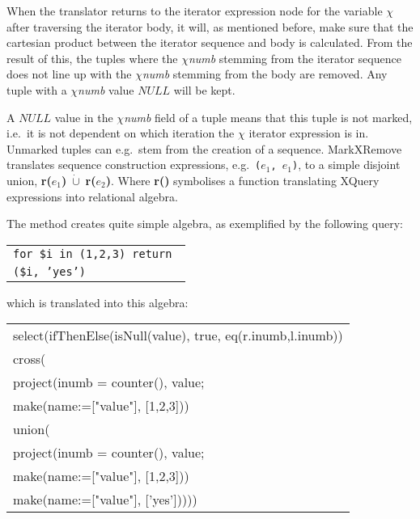 When the translator returns to the iterator expression node for the variable $\chi$ after traversing the iterator
body, it will, as mentioned before, make sure that the cartesian product between the iterator sequence and body is
calculated. From the result of this, the tuples where the $\chi$\textit{numb} stemming from the iterator
sequence does not line up with the $\chi$\textit{numb} stemming from the body are removed. Any tuple with a
$\chi$\textit{numb} value $NULL$ will be kept.

A $NULL$ value in the $\chi$\textit{numb} field of a tuple means that this tuple is not marked, i.e.\ it is
not dependent on which iteration the $\chi$ iterator expression is in. Unmarked
tuples can e.g.\ stem from the creation of a sequence. MarkXRemove translates sequence construction expressions,
e.g.\ \texttt{(}$e_{1}$\texttt{, }$e_{1}$\texttt{)}, to a simple disjoint union,
\textbf{r(}$e_{1}$\textbf{)}$\;\dot\cup\;$\textbf{r(}$e_{2}$\textbf{)}. Where \textbf{r()} symbolises a function
translating XQuery expressions into relational algebra.

The method creates quite simple algebra, as exemplified by the following query:

\begin{center}
\begin{tabular}{l}
\texttt{for \$i in (1,2,3) return } \\ \qquad
\texttt{(\$i, 'yes')}
\end{tabular}
\end{center}

which is translated into this algebra:
\begin{center}
\begin{tabular}{l}
\textsf{select(ifThenElse(isNull(value), true, eq(r.inumb,l.inumb))} \\ \quad
\textsf{cross(} \\\quad\quad
\textsf{project(inumb = counter(), value;}\\\quad\quad\quad
\textsf{make(name:=["value"], [1,2,3]))} \\\quad\quad
\textsf{union(} \\\quad\quad\quad
\textsf{project(inumb = counter(), value;} \\\quad\quad\quad\quad
\textsf{make(name:=["value"], [1,2,3]))} \\\quad\quad\quad
\textsf{make(name:=["value"], ['yes']))))}
\end{tabular}
\end{center}

